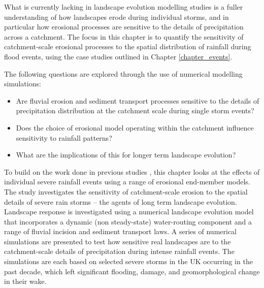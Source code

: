 What is currently lacking in landscape evolution modelling studies is a fuller understanding of how landscapes erode during individual storms, and in particular how erosional processes are sensitive to the details of precipitation across a catchment. The focus in this chapter is to quantify the sensitivity of catchment-scale erosional processes to the spatial distribution of rainfall during flood events, using the case studies outlined in Chapter \ref{chapter_events}.

The following questions are explored through the use of numerical modelling simulations:

\begin{itemize}
\item Are fluvial erosion and sediment transport processes sensitive to the details of precipitation distribution at the catchment scale during single storm events?
\item Does the choice of erosional model operating within the catchment influence sensitivity to rainfall patterns? 
\item What are the implications of this for longer term landscape evolution? 
\end{itemize}


To build on the work done in previous studies \citep[e.g.][]{coulthard2016sensitivity}, this chapter looks at the effects of individual severe rainfall events using a range of erosional end-member models. The study investigates the sensitivity of catchment-scale erosion to the spatial details of severe rain storms -- the agents of long term landscape evolution. Landscape response is investigated using a numerical landscape evolution model that incorporates a dynamic (non steady-state) water-routing component and a range of fluvial incision and sediment transport laws. A series of numerical simulations are presented to test how sensitive real landscapes are to the catchment-scale details of precipitation during intense rainfall events. The simulations are each based on selected severe storms in the UK occurring in the past decade, which left significant flooding, damage, and geomorphological change in their wake.

